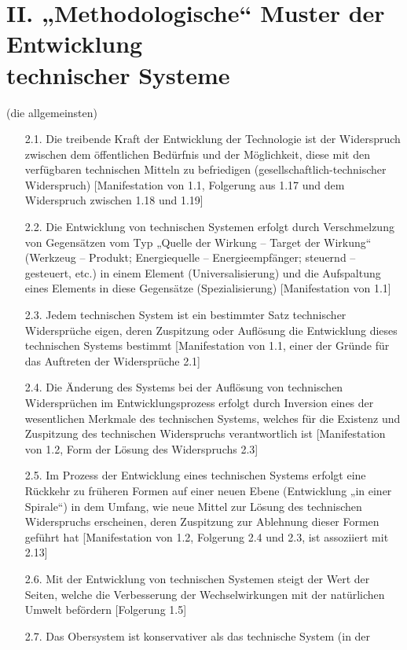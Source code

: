 \documentclass[11pt,a4paper]{article}
\begin{document}
\section*{II. „Methodologische“ Muster der Entwicklung\\ technischer Systeme}
(die allgemeinsten)
\begin{itemize}\itemsep0pt
\item[2.1.] Die treibende Kraft der Entwicklung der Technologie ist der
  Widerspruch zwischen dem öffentlichen Bedürfnis und der Möglichkeit, diese
  mit den verfügbaren technischen Mitteln zu befriedigen
  (gesellschaftlich-technischer Widerspruch) [Manifestation von 1.1, Folgerung
    aus 1.17 und dem Widerspruch zwischen 1.18 und 1.19]
\item[2.2.] Die Entwicklung von technischen Systemen erfolgt durch
  Verschmelzung von Gegen\-sätzen vom Typ „Quelle der Wirkung -- Target der
  Wirkung“ (Werkzeug -- Produkt; Energiequelle -- Energieempfänger; steuernd
  -- gesteuert, etc.) in einem Element (Universalisierung) und die Aufspaltung
  eines Elements in diese Gegensätze (Spezialisierung) [Manifestation von 1.1]
\item[2.3.] Jedem technischen System ist ein bestimmter Satz technischer
  Widersprüche eigen, deren Zuspitzung oder Auflösung die Entwicklung dieses
  technischen Systems bestimmt [Manifestation von 1.1, einer der Gründe für
    das Auftreten der Widersprüche 2.1]
\item[2.4.] Die Änderung des Systems bei der Auflösung von technischen
  Widersprüchen im Entwicklungsprozess erfolgt durch Inversion eines der
  wesentlichen Merkmale des technischen Systems, welches für die Existenz und
  Zuspitzung des technischen Widerspruchs verantwortlich ist [Manifestation
    von 1.2, Form der Lösung des Widerspruchs 2.3]
\item[2.5.] Im Prozess der Entwicklung eines technischen Systems erfolgt eine
  Rückkehr zu früheren Formen auf einer neuen Ebene (Entwicklung „in einer
  Spirale“) in dem Umfang, wie neue Mittel zur Lösung des technischen
  Widerspruchs erscheinen, deren Zuspitzung zur Ablehnung dieser Formen
  geführt hat [Manifestation von 1.2, Folgerung 2.4 und 2.3, ist assoziiert
    mit 2.13]
\item[2.6.] Mit der Entwicklung von technischen Systemen steigt der Wert der
  Seiten, welche die Verbesserung der Wechselwirkungen mit der natürlichen
  Umwelt befördern [Folgerung 1.5]
\item[2.7.] Das Obersystem ist konservativer als das technische System (in der

\end{itemize}
\end{document}
